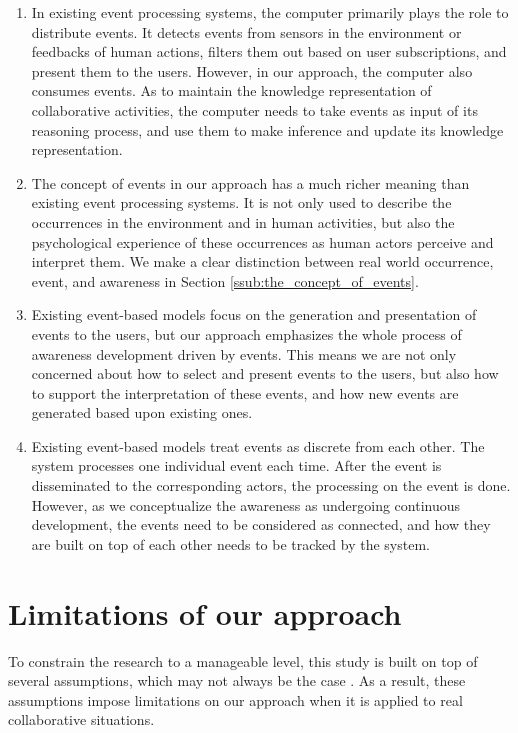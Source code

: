 \begin{enumerate}
   \item In existing event processing systems, the computer primarily plays the role to distribute events. It detects events from sensors in the environment or feedbacks of human actions, filters them out based on user subscriptions, and present them to the users. However, in our approach, the computer also consumes events. As to maintain the knowledge representation of collaborative activities, the computer needs to take events as input of its reasoning process, and use them to make inference and update its knowledge representation. 
   \item The concept of events in our approach has a much richer meaning than existing event processing systems. It is not only used to describe the occurrences in the environment and in human activities, but also the psychological experience of these occurrences as human actors perceive and interpret them. We make a clear distinction between real world occurrence, event, and awareness in Section \ref{ssub:the_concept_of_events}.
   \item Existing event-based models focus on the generation and presentation of events to the users, but our approach emphasizes the whole process of awareness development driven by events. This means we are not only concerned about how to select and present events to the users, but also how to support the interpretation of these events, and how new events are generated based upon existing ones.
   \item Existing event-based models treat events as discrete from each other. The system processes one individual event each time. After the event is disseminated to the corresponding actors, the processing on the event is done. However, as we conceptualize the awareness as undergoing continuous development, the events need to be considered as connected, and how they are built on top of each other needs to be tracked by the system.
\end{enumerate}
\section{Limitations of our approach} %
\label{sec:limitations_of_our_approach}
To constrain the research to a manageable level, this study is built on top of several assumptions, which may not always be the case . As a result, these assumptions impose limitations on our approach when it is applied to real collaborative situations.

